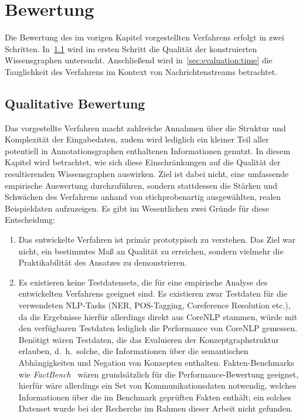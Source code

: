 \chapter{Bewertung}%
\label{sec:evaluation}

Die Bewertung des im vorigen Kapitel vorgestellten Verfahrens erfolgt in zwei Schritten.
In~\ref{sec:evaluation:quality} wird im ersten Schritt die Qualität der konstruierten Wissensgraphen untersucht.
Anschließend wird in~\ref{sec:evaluation:time} die Tauglichkeit des Verfahrens im Kontext von Nachrichtenstreams betrachtet.

\section{Qualitative Bewertung}%
\label{sec:evaluation:quality}

Das vorgestellte Verfahren macht zahlreiche Annahmen über die Struktur und Komplexität der Eingabedaten, zudem wird lediglich ein kleiner Teil aller potentiell in Annotationsgraphen enthaltenen Informationen genutzt.
In diesem Kapitel wird betrachtet, wie sich diese Einschränkungen auf die Qualität der resultierenden Wissensgraphen auswirken.
Ziel ist dabei nicht, eine umfassende empirische Auswertung durchzuführen, sondern stattdessen die Stärken und Schwächen des Verfahrens anhand von stichprobenartig ausgewählten, realen Beispieldaten aufzuzeigen.
Es gibt im Wesentlichen zwei Gründe für diese Entscheidung:
\begin{enumerate}
	\item Das entwickelte Verfahren ist primär prototypisch zu verstehen.
		Das Ziel war nicht, ein bestimmtes Maß an Qualität zu erreichen, sondern vielmehr die Praktikabilität des Ansatzes zu demonstrieren.
	\item Es existieren keine Testdatensets, die für eine empirische Analyse des entwickelten Verfahrens geeignet sind.
		Es existieren zwar Testdaten für die verwendeten NLP-Tasks (NER, POS-Tagging, Coreference Resolution etc.), da die Ergebnisse hierfür allerdings direkt aus CoreNLP stammen, würde mit den verfügbaren Testdaten lediglich die Performance von CoreNLP gemessen.
		Benötigt wären Testdaten, die das Evaluieren der Konzept\-graph\-struktur erlauben, d.~h.\ solche, die Informationen über die semantischen Abhängigkeiten und Negation von Konzepten enthalten.
		Fakten-Benchmarks wie \textit{FactBench}~\cite{FactBench} wären grundsätzlich für die Performance-Bewertung geeignet, hierfür wäre allerdings ein Set von Kommunikationsdaten notwendig, welches Informationen über die im Benchmark geprüften Fakten enthält;
		ein solches Datenset wurde bei der Recherche im Rahmen dieser Arbeit nicht gefunden.
\end{enumerate}

